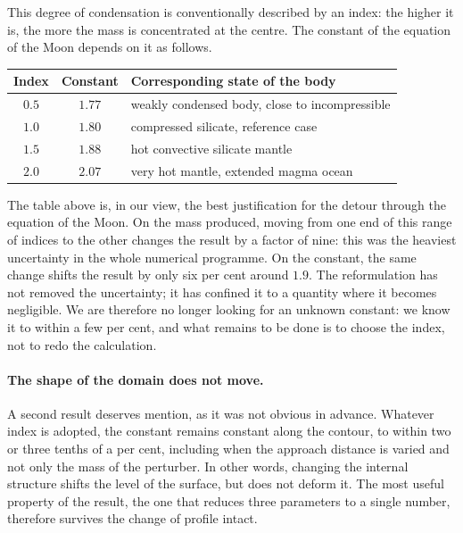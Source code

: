 \documentclass[11pt,a4paper,openany]{report}
\begin{document}
This degree of condensation is conventionally described by an index: the higher it is, the more the
mass is concentrated at the centre. The constant of the equation of the Moon depends on it as
follows.

\begin{center}
\begin{tabular}{ccl}
\toprule
\textbf{Index} & \textbf{Constant} & \textbf{Corresponding state of the body} \\
\midrule
$0.5$ & $1.77$ & weakly condensed body, close to incompressible \\
$1.0$ & $1.80$ & compressed silicate, reference case \\
$1.5$ & $1.88$ & hot convective silicate mantle \\
$2.0$ & $2.07$ & very hot mantle, extended magma ocean \\
\bottomrule
\end{tabular}
\end{center}

\begin{ideephys}
The table above is, in our view, the best justification for the detour through the equation of the
Moon. On the mass produced, moving from one end of this range of indices to the other changes the
result by a factor of nine: this was the heaviest uncertainty in the whole numerical programme. On
the constant, the same change shifts the result by only six per cent around $1.9$. The
reformulation has not removed the uncertainty; it has confined it to a quantity where it becomes
negligible. We are therefore no longer looking for an unknown constant: we know it to within a few
per cent, and what remains to be done is to choose the index, not to redo the calculation.
\end{ideephys}

\paragraph{The shape of the domain does not move.} A second result deserves mention, as it was not
obvious in advance. Whatever index is adopted, the constant remains constant along the contour, to
within two or three tenths of a per cent, including when the approach distance is varied and not
only the mass of the perturber. In other words, changing the internal structure shifts the level of
the surface, but does not deform it. The most useful property of the result, the one that reduces
three parameters to a single number, therefore survives the change of profile intact.
\end{document}
